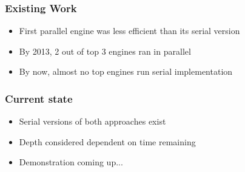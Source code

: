 \documentclass[aspectratio=43]{beamer}
\begin{document}
\begin{frame}
\frametitle{Existing Work}
\begin{itemize}
\item First parallel engine was less efficient than its serial version
\item By 2013, 2 out of top 3 engines ran in parallel
\item By now, almost no top engines run serial implementation
\end{itemize}
\end{frame}

\begin{frame}
\frametitle{Current state}
\begin{itemize}
\item Serial versions of both approaches exist
\item Depth considered dependent on time remaining
\item Demonstration coming up...
\end{itemize}
\end{frame}
\end{document}
